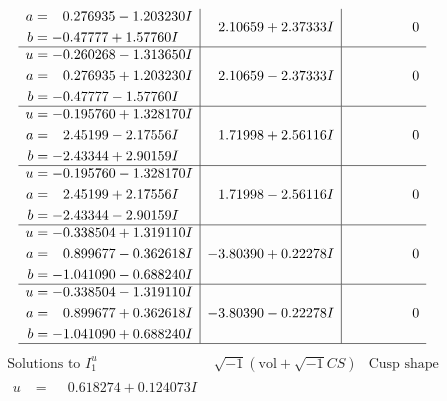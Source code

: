 \documentclass[1p]{elsarticle_modified}
\theoremstyle{definition}
\newcommand{\I}{\sqrt{-1}}
\begin{document}
$$\begin{array}{c|c|c}
\begin{aligned}
a &= \phantom{-}0.276935 - 1.203230 I \\
b &= -0.47777 + 1.57760 I\end{aligned}
 & \phantom{-}2.10659 + 2.37333 I & \phantom{-0.000000 } 0 \\ \hline\begin{aligned}
u &= -0.260268 - 1.313650 I \\
a &= \phantom{-}0.276935 + 1.203230 I \\
b &= -0.47777 - 1.57760 I\end{aligned}
 & \phantom{-}2.10659 - 2.37333 I & \phantom{-0.000000 } 0 \\ \hline\begin{aligned}
u &= -0.195760 + 1.328170 I \\
a &= \phantom{-}2.45199 - 2.17556 I \\
b &= -2.43344 + 2.90159 I\end{aligned}
 & \phantom{-}1.71998 + 2.56116 I & \phantom{-0.000000 } 0 \\ \hline\begin{aligned}
u &= -0.195760 - 1.328170 I \\
a &= \phantom{-}2.45199 + 2.17556 I \\
b &= -2.43344 - 2.90159 I\end{aligned}
 & \phantom{-}1.71998 - 2.56116 I & \phantom{-0.000000 } 0 \\ \hline\begin{aligned}
u &= -0.338504 + 1.319110 I \\
a &= \phantom{-}0.899677 - 0.362618 I \\
b &= -1.041090 - 0.688240 I\end{aligned}
 & -3.80390 + 0.22278 I & \phantom{-0.000000 } 0 \\ \hline\begin{aligned}
u &= -0.338504 - 1.319110 I \\
a &= \phantom{-}0.899677 + 0.362618 I \\
b &= -1.041090 + 0.688240 I\end{aligned}
 & -3.80390 - 0.22278 I & \phantom{-0.000000 } 0\\
 \hline 
 \end{array}$$\newpage$$\begin{array}{c|c|c}  
\text{Solutions to }I^u_{1}& \I (\text{vol} + \sqrt{-1}CS) & \text{Cusp shape}\\
 \hline 
\begin{aligned}
u &= \phantom{-}0.618274 + 0.124073 I \\

\end{aligned}
\end{array}$$
\end{document}
